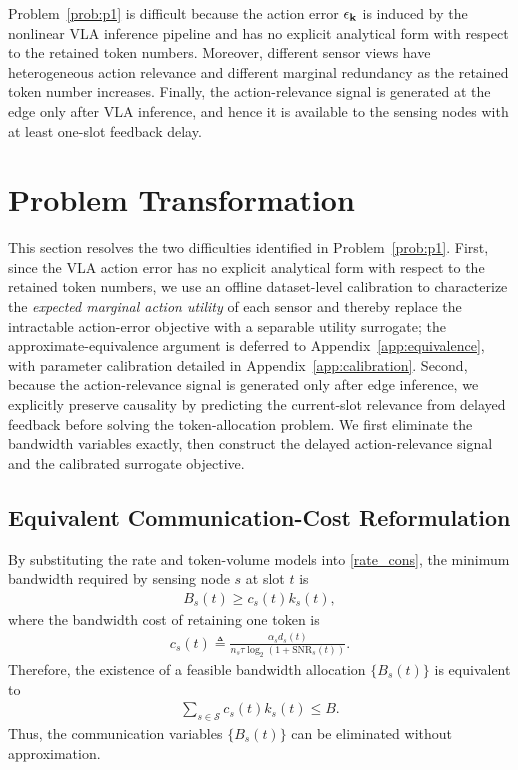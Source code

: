 \documentclass[lettersize,journal]{IEEEtran}
\theoremstyle{custom}
\begin{document}
Problem~\ref{prob:p1} is difficult because the action error $\epsilon_{\bf k}$ is induced by the nonlinear VLA inference pipeline and has no explicit analytical form with respect to the retained token numbers. Moreover, different sensor views have heterogeneous action relevance and different marginal redundancy as the retained token number increases. Finally, the action-relevance signal is generated at the edge only after VLA inference, and hence it is available to the sensing nodes with at least one-slot feedback delay.

\section{Problem Transformation}
This section resolves the two difficulties identified in Problem~\ref{prob:p1}. First, since the VLA action error has no explicit analytical form with respect to the retained token numbers, we use an offline dataset-level calibration to characterize the \emph{expected marginal action utility} of each sensor and thereby replace the intractable action-error objective with a separable utility surrogate; the approximate-equivalence argument is deferred to Appendix~\ref{app:equivalence}, with parameter calibration detailed in Appendix~\ref{app:calibration}. Second, because the action-relevance signal is generated only after edge inference, we explicitly preserve causality by predicting the current-slot relevance from delayed feedback before solving the token-allocation problem. We first eliminate the bandwidth variables exactly, then construct the delayed action-relevance signal and the calibrated surrogate objective.
\subsection{Equivalent Communication-Cost Reformulation}
By substituting the rate and token-volume models into \eqref{rate_cons}, the minimum bandwidth required by sensing node $s$ at slot $t$ is
\begin{align}
    B_s(t) \geq c_s(t) k_s(t),
\end{align}
where the bandwidth cost of retaining one token is
\begin{align}\label{eq:token_cost}
    c_s(t) \triangleq
    \frac{\alpha_s d_s(t)}{n_s\tau\log_2\!\left(1+\mathrm{SNR}_s(t)\right)}.
\end{align}
Therefore, the existence of a feasible bandwidth allocation $\{B_s(t)\}$ is equivalent to
\begin{align}\label{eq:reduced_bandwidth}
    \sum_{s\in\mathcal S}c_s(t)k_s(t)\leq B.
\end{align}
Thus, the communication variables $\{B_s(t)\}$ can be eliminated without approximation.
\end{document}
